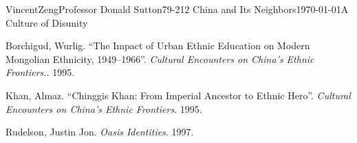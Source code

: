 \documentclass{article}[12pt]
\begin{document}
\begin{mla}{Vincent}{Zeng}{Professor Donald Sutton}{79-212 China and Its Neighbors}{\today}{A Culture of Disunity}
\begin{workscited}
	
	\bibent
	Borchigud, Wurlig. ``The Impact of Urban Ethnic Education on Modern Mongolian Ethnicity, 1949--1966''. \textit{Cultural Encounters on China's Ethnic Frontiers.}. 1995.

	\bibent
	Khan, Almaz. ``Chinggis Khan: From Imperial Ancestor to Ethnic Hero''. \textit{Cultural Encounters on China's Ethnic Frontiers}. 1995.
	
	\bibent
	Rudelson, Justin Jon. \textit{Oasis Identities}. 1997.
\end{workscited}
\end{mla}
\end{document}

